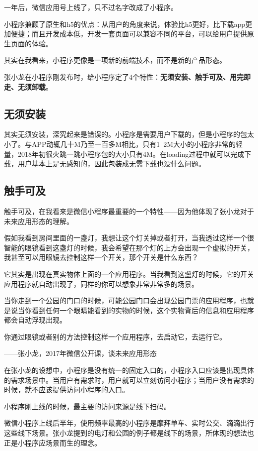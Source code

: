 \documentclass[12pt]{article}
\begin{document}
一年后，微信应用号上线了，只不过名字改成了小程序。

小程序兼顾了原生和h5的优点：从用户的角度来说，体验比h5更好，比下载app更加便捷；而且开发成本低，开发一套页面可以兼容不同的平台，可以给用户提供原生页面的体验。

其实在我看来，小程序更像是一项新的前端技术，而不是新的产品形态。

张小龙在小程序刚发布时，给小程序定了4个特性：\textbf{无须安装、触手可及、用完即走、无须卸载}。

\subsection{无须安装}
其实无须安装，深究起来是错误的。小程序是需要用户下载的，但是小程序的包太小了。与APP动辄几十M乃至一百多M相比，只有1~2M大小的小程序非常的轻量，2018年初很火跳一跳小程序包的大小只有4M。在loading过程中就可以完成下载，用户基本上是无感知的，因此包装成无需下载也没什么问题。

\subsection{触手可及}
触手可及，在我看来是微信小程序最重要的一个特性——因为他体现了张小龙对于未来应用形态的理解。

假如我看到房间里面的一盏灯，我想让这个灯关掉或者打开，当我透过这样一个很智能的眼镜看到这盏灯的时候，我会希望在那个灯的上方会出现一个虚拟的开关，我甚至可以用眼镜去控制这样一个开关，那个开关是什么东西？

它其实是出现在真实物体上面的一个应用程序。当我看到这盏灯的时候，它的开关应用程序就自动出现了，同样的你可以想象非常非常多的场景。

当你走到一个公园的门口的时候，可能公园门口会出现公园门票的应用程序，也就是说当你看到任何一个眼睛能看到的实物的时候，这个实物背后的信息和应用程序都会自动浮现出现。

\begin{framed}
你通过眼镜或者别的方法控制这样一个应用程序，去启动它，去运行它。

——张小龙，2017年微信公开课，谈未来应用形态
\end{framed}

在张小龙的设想中，小程序是没有统一的固定入口的，小程序入口应该是出现具体的需求场景中。当用户有需求时，用户就可以立刻访问小程序；当用户没有需求的时候，就不应该提供访问小程序的入口。

小程序刚上线的时候，最主要的访问来源是线下扫码。

微信小程序上线后半年，使用频率最高的小程序是摩拜单车、实时公交、滴滴出行这些线下场景。张小龙提到的电灯和公园的例子都是线下的场景，所体现的想法也正是小程序应场景而生的理念。
\end{document}
